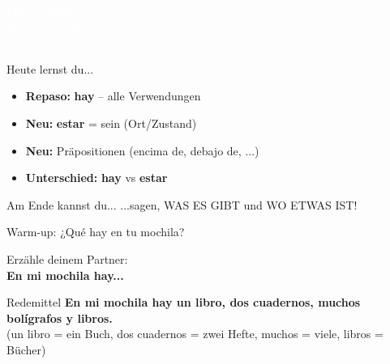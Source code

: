 \documentclass[aspectratio=169, 11pt]{beamer}
\newcommand{\es}[1]{\textbf{\textcolor{spanischrot}{#1}}}
\newcommand{\estar}[1]{\textbf{\textcolor{blau}{#1}}}
\begin{document}
{
\begin{frame}[plain]
\begin{center}
\vspace{2cm}
{\Huge\bfseries\textcolor{white}{Hay y estar}}\\[0.5cm]
{\Large\textcolor{white}{Wo ist was? Was gibt es?}}\\[1.5cm]
{\large\textcolor{white}{Spanisch · Klasse 7 · Unidad 2}}
\end{center}
\end{frame}
}

\begin{frame}{Heute lernst du...}
\begin{itemize}
    \item[\textcolor{spanischrot}{\textbullet}] \textbf{Repaso:} \es{hay} -- alle Verwendungen
    \item[\textcolor{spanischrot}{\textbullet}] \textbf{Neu:} \estar{estar} = sein (Ort/Zustand)
    \item[\textcolor{spanischrot}{\textbullet}] \textbf{Neu:} Präpositionen (encima de, debajo de, ...)
    \item[\textcolor{spanischrot}{\textbullet}] \textbf{Unterschied:} \es{hay} vs \estar{estar}
\end{itemize}

\vspace{0.8cm}

\begin{block}{Am Ende kannst du...}
...sagen, WAS ES GIBT und WO ETWAS IST!
\end{block}
\end{frame}

\begin{frame}{Warm-up: ¿Qué hay en tu mochila?}

\begin{center}
{\Large Erzähle deinem Partner:}\\[0.5cm]
{\Huge \es{En mi mochila hay...}}
\end{center}

\vspace{1cm}

\begin{block}{Redemittel}
\es{En mi mochila hay un libro, dos cuadernos, muchos bolígrafos y libros.}\\
{\small\textcolor{dunkelgrau}{(un libro = ein Buch, dos cuadernos = zwei Hefte, muchos = viele, libros = Bücher)}}
\end{block}

\end{frame}
\end{document}
